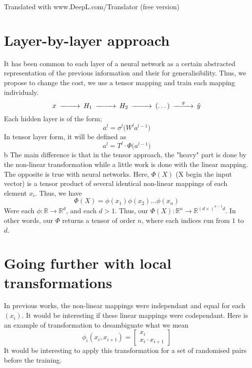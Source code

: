 \documentclass[11pt]{article}
\begin{document}
Translated with www.DeepL.com/Translator (free version)

\section{Layer-by-layer approach}
It has been common to each layer of a neural network as a certain abstracted representation of the previous information and their for generalisibility. Thus, we propose to change the cost, we use a tensor mapping and train each mapping individualy.
\begin{equation*}
\begin{CD}
    x @>>>H_1 @>>>H_2 @>>>(\dots)@>g>> \hat{y}
\end{CD}
\end{equation*}
Each hidden layer is of the form;
\begin{equation*}
    a^l = \sigma^l \bigl( W^l a^{l-1} \bigr)
\end{equation*}
In tensor layer form, it will be defined as 
\begin{equation*}
    a^l = T^l \cdot \Phi \bigl( a^{l-1} \bigr)
\end{equation*}b
The main difference is that in the tensor approach, the "heavy" part is done by the non-linear transformation while a little work is done with the linear mapping. The opposite is true with neural networks. Here, $\Phi(X)$ (X begin the input vector) is a tensor product of several identical non-linear mappings of each element $x_i$. Thus, we have 
\begin{equation*}
    \Phi(X) = \phi(x_1)\phi(x_2)\dots\phi(x_n)
\end{equation*}
Were each $\phi : \mathbb{R} \rightarrow \mathbb{R}^d$, and each $d > 1$. Thus, our $\Phi(X) : \mathbb{R}^n \rightarrow \mathbb{R}^{ (d \times)^{n-1}d} $. In other words, our $\Phi$ returns a tensor of order $n$, where each indices run from $1$ to $d$.


\section{Going further with local transformations}
In previous works, the non-linear mappings were independant and equal for each $(x_i)$. It would be interesting if these linear mappings were codependant. Here is an example of transformation to desambiguate what we mean
\begin{equation*}
    \phi_i(x_{i}, x_{i+1}) = \begin{bmatrix}
                                x_{i} \\
                                x_{i} \cdot x_{i+1}
                            \end{bmatrix}
\end{equation*}
It would be interesting to apply this transformation for a set of randomised pairs before the training.
\end{document}
